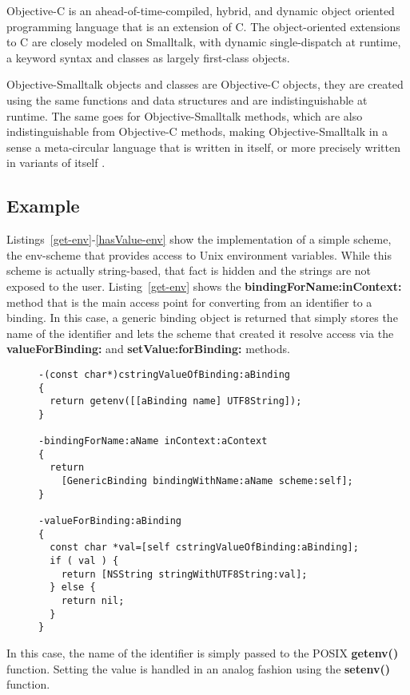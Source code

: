 \documentclass[preprint,authoryear]{acm_proc_article-sp}
\begin{document}
Objective-C is an ahead-of-time-compiled, hybrid, and dynamic object oriented programming language
that is an extension of C.  The object-oriented extensions to C are closely modeled on
Smalltalk, with dynamic single-dispatch at runtime, a keyword syntax and classes as
largely first-class objects.

Objective-Smalltalk objects and classes are Objective-C objects, they are created using
the same functions and data structures and are indistinguishable at runtime.
The same goes for Objective-Smalltalk methods, which are also indistinguishable from
Objective-C methods, making Objective-Smalltalk in a sense a meta-circular language
that is written in itself, or more precisely written in variants of itself \cite{kleinvm}\cite{squeak}.



\subsection{Example}

Listings~\ref{get-env}-\ref{hasValue-env} show the implementation of a simple scheme,
the env-scheme that provides access to Unix environment variables.  While this scheme
is actually string-based, that fact is hidden and the strings are not exposed to the user.
Listing~\ref{get-env}
shows the {\bf bindingForName:inContext:} method that is the main access point for
converting from an identifier to a binding.  In this case, a generic binding object is returned
that simply stores the name of the identifier and lets the scheme that created it resolve
access via the {\bf valueForBinding:} and {\bf setValue:forBinding:} methods.


\begin{figure}[htbp]
\begin{lstlisting}[style=L,label=get-env,caption=Basic lookup in env: scheme.]
-(const char*)cstringValueOfBinding:aBinding
{
  return getenv([[aBinding name] UTF8String]);
}

-bindingForName:aName inContext:aContext
{
  return
    [GenericBinding bindingWithName:aName scheme:self];
}

-valueForBinding:aBinding
{
  const char *val=[self cstringValueOfBinding:aBinding];
  if ( val ) {
    return [NSString stringWithUTF8String:val];
  } else {
    return nil;
  }
}
\end{lstlisting}
\end{figure}

In this case, the name of the identifier is simply passed to the POSIX {\bf getenv()} function.
Setting the value is handled in an analog fashion using the {\bf setenv()} function.
\end{document}
